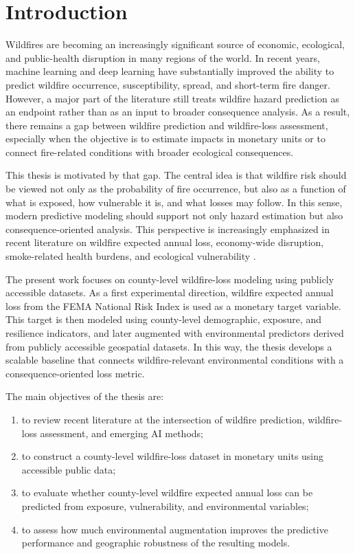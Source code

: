 \chapter{Introduction}
\label{chap:introduction}

Wildfires are becoming an increasingly significant source of economic, ecological, and public-health disruption in many regions of the world. In recent years, machine learning and deep learning have substantially improved the ability to predict wildfire occurrence, susceptibility, spread, and short-term fire danger. However, a major part of the literature still treats wildfire hazard prediction as an endpoint rather than as an input to broader consequence analysis. As a result, there remains a gap between wildfire prediction and wildfire-loss assessment, especially when the objective is to estimate impacts in monetary units or to connect fire-related conditions with broader ecological consequences.

This thesis is motivated by that gap. The central idea is that wildfire risk should be viewed not only as the probability of fire occurrence, but also as a function of what is exposed, how vulnerable it is, and what losses may follow. In this sense, modern predictive modeling should support not only hazard estimation but also consequence-oriented analysis. This perspective is increasingly emphasized in recent literature on wildfire expected annual loss, economy-wide disruption, smoke-related health burdens, and ecological vulnerability \citep{asif2026supranational,wang2021economicfootprint,law2025anthropogenic,arrogantefunes2024ecological}.

The present work focuses on county-level wildfire-loss modeling using publicly accessible datasets. As a first experimental direction, wildfire expected annual loss from the FEMA National Risk Index is used as a monetary target variable. This target is then modeled using county-level demographic, exposure, and resilience indicators, and later augmented with environmental predictors derived from publicly accessible geospatial datasets. In this way, the thesis develops a scalable baseline that connects wildfire-relevant environmental conditions with a consequence-oriented loss metric.

The main objectives of the thesis are:
\begin{enumerate}
    \item to review recent literature at the intersection of wildfire prediction, wildfire-loss assessment, and emerging AI methods;
    \item to construct a county-level wildfire-loss dataset in monetary units using accessible public data;
    \item to evaluate whether county-level wildfire expected annual loss can be predicted from exposure, vulnerability, and environmental variables;
    \item to assess how much environmental augmentation improves the predictive performance and geographic robustness of the resulting models.
\end{enumerate}

